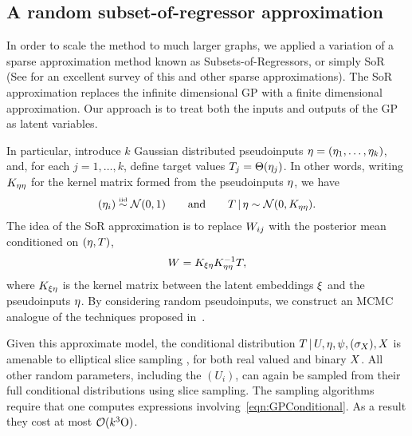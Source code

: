 \subsection{A random subset-of-regressor approximation}

In order to scale the method to much larger graphs, we applied a variation of a sparse approximation method known as Subsets-of-Regressors, or simply SoR \citep{Alex_J_Smola2001-ev,Wahba1999-bl,Silverman1985-ys} (See \citep{Quinonero-Candela2005-er} for an excellent survey of this and other sparse approximations).
The SoR approximation replaces the infinite dimensional GP with a finite dimensional approximation.
Our approach is to treat both the inputs and outputs of the GP as latent variables.

In particular, 
introduce $k$ Gaussian distributed pseudoinputs $\eta=(\eta_1,\dotsc,\eta_k)$, and, for each $j=1,\dotsc,k$, define target values ${T_j = \Theta(\eta_j)}$.  In other words, writing $K_{\eta\eta}$ for the kernel matrix formed from the pseudoinputs $\eta$, we have
\[
(\eta_i) \overset{\mbox{\tiny iid}}{\sim} \mathcal{N}(0,1) \qquad\text{and}\qquad
T \,|\, \eta \sim \mathcal{N}(0,K_{\eta\eta}).
\]
The idea of the SoR approximation is to replace $W_{ij}$ with the posterior mean conditioned on $(\eta,T)$,
\[
W = K_{\xi\eta} K_{\eta\eta}^{-1}T,
\label{eqn:GPConditional}
\]
where $K_{\xi\eta}$ is the kernel matrix between the latent embeddings $\xi$ and the pseudoinputs $\eta$.  By considering random pseudoinputs, we construct an MCMC analogue of the techniques proposed in~\cite{Titsias2008-gp}.

Given this approximate model, the conditional distribution $T \,|\, U, \eta, \psi, (\sigma_X), X$ is amenable to elliptical slice sampling \citep{Murray2010-zu}, for both real valued and binary $X$. All other random parameters, including the $(U_i)$, can again be sampled from their full conditional distributions using slice sampling.  The sampling algorithms require that one computes expressions involving~\eqref{eqn:GPConditional}. As a result they cost at most $\mathcal{O}(k^3 \mathrm O)$.

